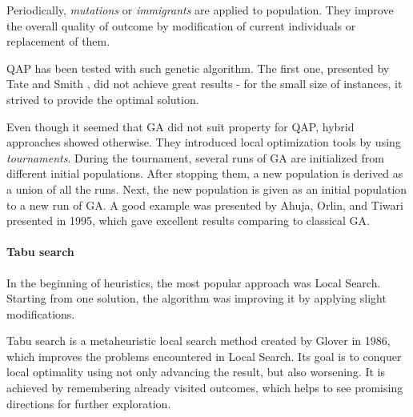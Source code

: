 Periodically, \textit{mutations} or \textit{immigrants} are applied to population.
They improve the overall quality of outcome by modification of current individuals or replacement of them.

QAP has been tested with such genetic algorithm.
The first one, presented by Tate and Smith \cite{tate1995genetic}, did not achieve great results - for the small size of instances, it strived to provide the optimal solution.

Even though it seemed that GA did not suit property for QAP, hybrid approaches showed otherwise.
They introduced local optimization tools by using \textit{tournaments}.
During the tournament, several runs of GA are initialized from different initial populations.
After stopping them, a new population is derived as a union of all the runs.
Next, the new population is given as an initial population to a new run of GA.
A good example was presented by Ahuja, Orlin, and Tiwari \cite{ahuja2000greedy} presented in 1995, which gave excellent results comparing to classical GA.

\paragraph{Tabu search}

In the beginning of heuristics, the most popular approach was Local Search.
Starting from one solution, the algorithm was improving it by applying slight modifications.

Tabu search is a metaheuristic local search method created by Glover \cite{glover1986future} in 1986, which improves the problems encountered in Local Search.
Its goal is to conquer local optimality using not only advancing the result, but also worsening.
It is achieved by remembering already visited outcomes, which helps to see promising directions for further exploration.

